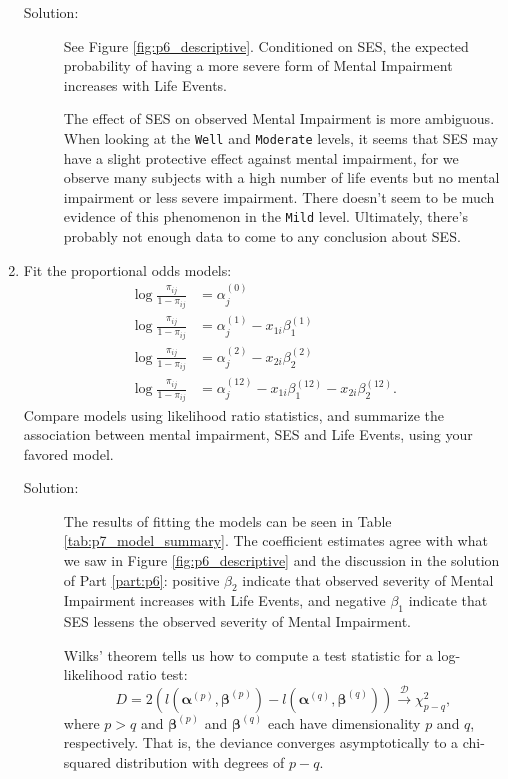 \documentclass[letterpaper,11pt]{article}
\begin{document}
\begin{enumerate}
  \begin{description}
  \item[Solution:] See Figure \ref{fig:p6_descriptive}. Conditioned on SES, the
    expected probability of having a more severe form of Mental Impairment
    increases with Life Events.

    The effect of SES on observed Mental Impairment is more ambiguous. When
    looking at the \texttt{Well} and \texttt{Moderate} levels, it seems that SES
    may have a slight protective effect against mental impairment, for we
    observe many subjects with a high number of life events but no mental
    impairment or less severe impairment. There doesn't seem to be much evidence
    of this phenomenon in the \texttt{Mild} level. Ultimately, there's probably
    not enough data to come to any conclusion about SES.
  \end{description}
\item Fit the proportional odds models:
  \begin{align}
    \log\frac{\pi_{ij}}{1 - \pi_{ij}}
    &= \alpha_j^{(0)}
      \label{eqn:p7_model_1} \\
    \log\frac{\pi_{ij}}{1 - \pi_{ij}}
    &= \alpha_j^{(1)} - x_{1i}\beta_1^{(1)}
      \label{eqn:p7_model_2} \\
    \log\frac{\pi_{ij}}{1 - \pi_{ij}}
    &=  \alpha_j^{(2)} - x_{2i}\beta_2^{(2)}
      \label{eqn:p7_model_3} \\
    \log\frac{\pi_{ij}}{1 - \pi_{ij}}
    &= \alpha_j^{(12)} - x_{1i}\beta_1^{(12)} - x_{2i}\beta_2^{(12)}.
      \label{eqn:p7_model_4}
  \end{align}
  Compare models using likelihood ratio statistics, and summarize the
  association between mental impairment, SES and Life Events, using your favored
  model.

  
  
  \begin{description}
  \item[Solution:] The results of fitting the models can be seen in Table
    \ref{tab:p7_model_summary}. The coefficient estimates agree with what we saw
    in Figure \ref{fig:p6_descriptive} and the discussion in the solution of
    Part \ref{part:p6}: positive $\beta_2$ indicate that observed severity of
    Mental Impairment increases with Life Events, and negative $\beta_1$
    indicate that SES lessens the observed severity of Mental Impairment.

    Wilks' theorem tells us how to compute a test statistic for a log-likelihood
    ratio test:
    \begin{equation}
      D = 2\left(
        l\left(\bm\alpha^{(p)}, \bm\beta^{(p)}\right) -
        l\left(\bm\alpha^{(q)}, \bm\beta^{(q)}\right)        
      \right) \xrightarrow{\mathcal{D}} \chi^2_{p - q},
      \label{eqn:p7_deviance}
    \end{equation}
    where $p > q$ and $\bm\beta^{(p)}$ and $\bm\beta^{(q)}$ each have
    dimensionality $p$ and $q$, respectively. That is, the deviance converges
    asymptotically to a chi-squared distribution with degrees of $p-q$.


\end{description}
\end{enumerate}
\end{document}
